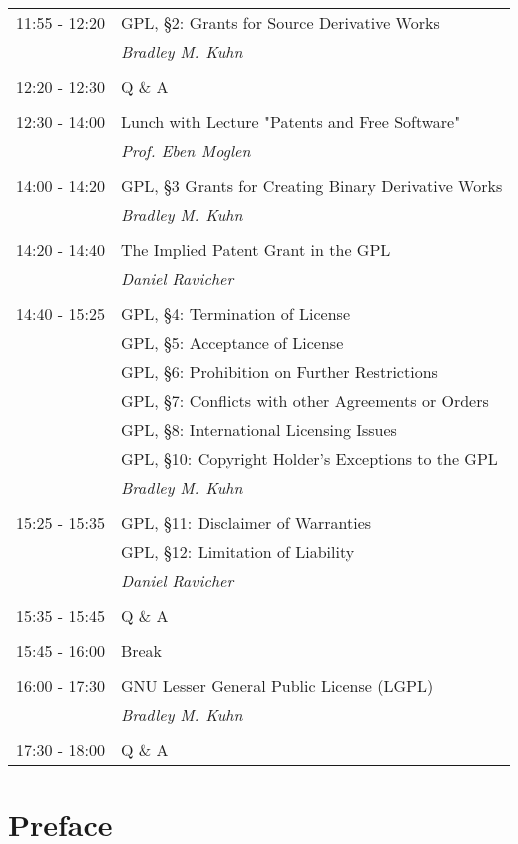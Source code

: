 \documentclass[11pt, letterpaper]{book}
\begin{document}
\begin{tabular}[t]{ll}
11:55 - 12:20 & GPL, \S 2: Grants for Source Derivative Works\\
& \textit{Bradley M. Kuhn}\\
&\\
12:20 - 12:30 & Q \& A\\
&\\
12:30 - 14:00 & Lunch with Lecture "Patents and Free Software"\\
& \textit{Prof. Eben Moglen}\\
&\\
14:00 - 14:20 & GPL, \S 3 Grants for Creating Binary Derivative Works\\
& \textit{Bradley M. Kuhn}\\
&\\
14:20 - 14:40 & The Implied Patent Grant in the GPL\\
& \textit{Daniel Ravicher}\\
&\\
14:40 - 15:25 & GPL, \S 4: Termination of License\\
& GPL, \S 5: Acceptance of License\\
& GPL, \S 6: Prohibition on Further Restrictions\\
& GPL, \S 7: Conflicts with other Agreements or Orders\\
& GPL, \S 8: International Licensing Issues\\
& GPL, \S 10: Copyright Holder's Exceptions to the GPL\\
& \textit{Bradley M. Kuhn}\\
&\\
15:25 - 15:35 & GPL, \S 11: Disclaimer of Warranties\\
& GPL, \S 12: Limitation of Liability\\
& \textit{Daniel Ravicher}\\
&\\
15:35 - 15:45 & Q \& A\\
&\\
15:45 - 16:00 & Break\\
&\\
16:00 - 17:30 & GNU Lesser General Public License (LGPL)\\
& \textit{Bradley M. Kuhn}\\
&\\
17:30 - 18:00 & Q \& A\\
\end{tabular}

\chapter*{Preface}
\end{document}
